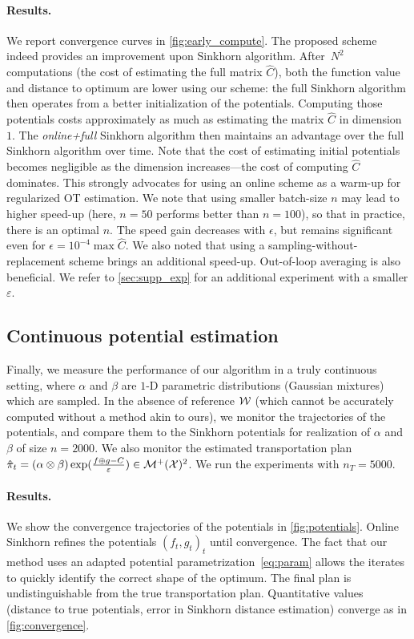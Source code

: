 \paragraph{Results.} We report convergence curves in
\autoref{fig:early_compute}. The proposed scheme indeed provides an improvement
upon Sinkhorn algorithm. After $N^2$ computations (the cost of estimating the
full matrix $\hat C$), both the function value and distance to optimum are lower
using our scheme: the full Sinkhorn algorithm then operates from a better
initialization of the potentials. Computing those potentials costs approximately as much as
estimating the matrix $\hat C$ in dimension $1$. The \textit{online+full}
Sinkhorn algorithm then maintains an advantage over the full Sinkhorn algorithm
over time. Note that the cost of estimating initial potentials becomes negligible
as the dimension increases---the cost of computing $\hat C$ dominates. This
strongly advocates for using an online scheme as a warm-up for regularized OT
estimation. We note that using smaller batch-size $n$ may lead to higher speed-up (here, $n=50$ performs better than $n=100$), so that in practice, there is an optimal $n$. The speed gain decreases with $\epsilon$, but remains
significant even for $\epsilon = 10^{-4} \max \hat C$. We also noted that
using a sampling-without-replacement scheme brings an additional speed-up. Out-of-loop averaging is also beneficial. We refer to \autoref{sec:supp_exp} for an additional experiment with a smaller $\varepsilon$.

\subsection{Continuous potential estimation}

Finally, we measure the performance of our algorithm in a truly continuous
setting, where $\alpha$ and $\beta$ are $1$-D parametric distributions (Gaussian
mixtures) which are sampled. In the absence of reference $\mathcal{W}$ (which cannot be accurately computed
without a method akin to ours), we monitor the
trajectories of the potentials, and compare them to the Sinkhorn potentials for
realization of $\alpha$ and $\beta$ of size $n=2000$. We also monitor the
estimated transportation plan $\hat \pi_t = (\alpha \otimes \beta)
\exp(\frac{f\oplus g - C}{\varepsilon}) \in \mathcal{M}^+(\mathcal{X})^2$. We run the experiments with
$n_T=5000$.

\paragraph{Results.} We show the convergence trajectories of the potentials in
\autoref{fig:potentials}. Online Sinkhorn refines the potentials $(f_t, g_t)_t$ until convergence. The fact that our method uses an adapted potential parametrization~\eqref{eq:param}
allows the iterates to quickly identify the correct shape of the optimum. The
final plan is undistinguishable from the true transportation plan. Quantitative
values (distance to true potentials, error in Sinkhorn distance estimation) converge as in
\autoref{fig:convergence}.

